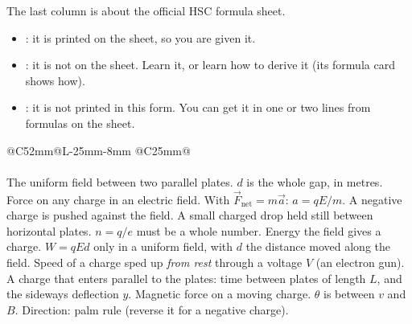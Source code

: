 The last column is about the official HSC formula sheet.
\begin{itemize}[itemsep=0pt, topsep=2pt]
  \item \fsYes: it is printed on the sheet, so you are given it.
  \item \fsNo: it is not on the sheet. Learn it, or learn how to derive it (its formula
        card shows how).
  \item \fsComb: it is not printed in this form. You can get it in one or two lines from
        formulas on the sheet.
\end{itemize}
\par\smallskip

{\small
\setlength\LTpre{8pt}\setlength\LTpost{6pt}
\renewcommand\arraystretch{1.1}
\begin{longtable}{@{}C{52mm}@{\hspace{4mm}}L{\dimexpr\linewidth-52mm-25mm-8mm\relax}%
    @{\hspace{4mm}}C{25mm}@{}}
  \fshead\\\hline\endfirsthead
  \fshead\\\hline\endhead
    {The uniform field between two parallel plates. $d$ is the whole gap, in metres.}
    {Force on any charge in an electric field. With $\vec{F}_\mathrm{net} = m\vec{a}$:
     $a = qE/m$. A negative charge is pushed against the field.}
    {A small charged drop held still between horizontal plates. $n = q/e$ must be a whole
     number.}
    {Energy the field gives a charge. $W = qEd$ only in a uniform field, with $d$ the
     distance moved along the field.}
    {Speed of a charge sped up \emph{from rest} through a voltage $V$ (an electron gun).}
    {A charge that enters parallel to the plates: time between plates of length $L$, and
     the sideways deflection $y$.}
    {Magnetic force on a moving charge. $\theta$ is between $v$ and $B$. Direction: palm
     rule (reverse it for a negative charge).}

\end{longtable}}
